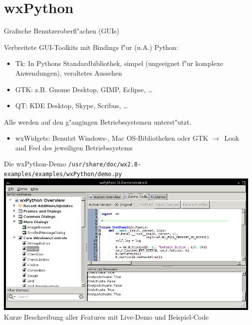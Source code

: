 \section{wxPython}


\begin{frame}{Grafische Benutzeroberfl"achen (GUIs)}

Verbreitete GUI-Toolkits mit Bindings f"ur (u.A.) Python:
\begin{itemize}
\item \alert{Tk}: In Pythons Standardbibliothek, simpel (ungeeignet f"ur komplexe Anwendungen), veraltetes Aussehen
\item \alert{GTK}: z.B. Gnome Desktop, GIMP, Eclipse, \dots
\item \alert{QT}: KDE Desktop, Skype, Scribus, \dots
\end{itemize}
Alle werden auf den g"angingen Betriebssystemen unterst"utzt.
\vspace{3mm}
\begin{itemize}
\item \alert{wxWidgets}: Benutzt  Windows-, Mac OS-Bibliotheken oder GTK $\rightarrow$~Look and Feel des jeweiligen Betriebssystems
\end{itemize}
\end{frame}

\begin{frame}{Die wxPython-Demo}
\lstinline{/usr/share/doc/wx2.8-examples/examples/wxPython/demo.py}\\[2mm]
\includegraphics[width=\textwidth]{images/wxpython_demo.png}\\
Kurze Beschreibung aller Features mit Live-Demo und Beispiel-Code
\end{frame}

